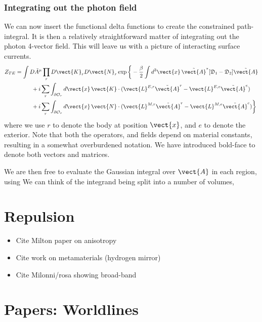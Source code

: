 \subsubsection{Integrating out the photon field}

We can now insert the functional delta functions to create the constrained path-integral.  
It is then a relatively straightforward matter of integrating out the photon 4-vector field.  
This will leave us with a picture of interacting surface currents.  
\begin{align}
  Z_{TE} &= \int D\tilde{A}^\mu \prod_rD\vect{K}_rD\vect{N}_r\exp\bigg\{-\frac{\beta}{2}\int d^3\vect{x}\,
    \tilde{\vect{A}}^{*} [\mathfrak{D}_1 -\mathfrak{D}_2]\tilde{\vect{A}}\nonumber\\
    &\hspace{1cm}  +i\sum_{r} \int_{\partial\mathcal{O}_r}d\vect{x}\,\vect{K}\cdot(
    \vect{L}^{E,r}\tilde{\vect{A}}^{r}-\vect{L}^{E,e}\tilde{\vect{A}}^e)\nonumber\\
    &\hspace{1cm}  +i\sum_{r} \int_{\partial\mathcal{O}_r}d\vect{x}\,\vect{N}\cdot(
    \vect{L}^{M,r}\tilde{\vect{A}}^{r}-\vect{L}^{M,e}\tilde{\vect{A}}^e)\bigg\}
\end{align}
where we use $r$ to denote the body at position $\vect{x}$, and $e$ to denote the exterior.
Note that both the operators, and fields depend on material constants, resulting in a somewhat
overburdened notation.  We have introduced bold-face to denote both vectors and matrices.

We are then free to evaluate the Gaussian integral over $\vect{A}$ in each region, using
We can think of the integrand being split into a number of volumes, 

\section{Repulsion}

\begin{itemize}
\item Cite Milton paper on anisotropy \cite{Milton2012, Milton2012a}
\item Cite work on metamaterials (hydrogen mirror)
\item Cite Milonni/rosa showing broad-band \cite{Rosa2010}
\end{itemize}

\section{Papers: Worldlines}

